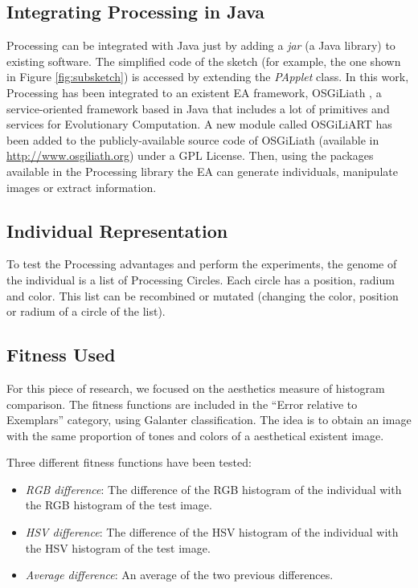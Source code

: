 \documentclass[a4paper,twoside]{article}
\begin{document}
\subsection{Integrating Processing in Java}
Processing can be integrated with Java just by adding a {\em jar} (a Java library) to existing software. The simplified code of the sketch (for example, the one shown in Figure \ref{fig:subsketch}) is accessed by extending the {\em PApplet} class. In this work, Processing has been integrated to an existent EA framework, OSGiLiath \cite{OSGILIATH}, a service-oriented framework based in Java that includes a lot of primitives and services for Evolutionary Computation. A new module called OSGiLiART has been added to the publicly-available source code of OSGiLiath (available in \url{http://www.osgiliath.org}) under a GPL License. Then, using the packages available in the Processing library the EA can generate individuals, manipulate images or extract information.

\subsection{Individual Representation}

To test the Processing advantages and perform the experiments, the genome of the individual is a list of Processing Circles. Each circle has a position, radium and color. This list can be recombined or mutated (changing the color, position or radium of a circle of the list).

\subsection{Fitness Used}
For this piece of research, we focused on the aesthetics measure of histogram comparison. The fitness functions are included in the ``Error relative to Exemplars'' category, using Galanter \cite{galanter2012computational} classification. The idea is to obtain an image with the same proportion of tones and colors of a aesthetical existent image.

Three different fitness functions have been tested:
\begin{itemize}
\item {\em RGB difference}: The difference of the RGB histogram of the individual with the RGB histogram of the test image.
\item {\em HSV difference}: The difference of the HSV histogram of the individual with the HSV histogram of the test image.
\item {\em Average difference}: An average of the two previous differences.
\end{itemize}
\end{document}
